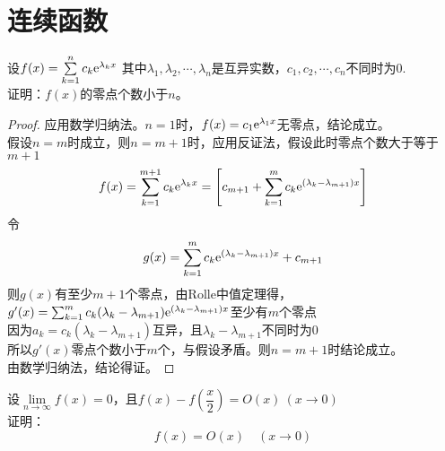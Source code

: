 \section{连续函数}

\begin{proposition}

    设$f(x) = \sum\limits_{k=1}^{n}{c_k\mathrm{e}^{\lambda_k x}}$
    其中$\lambda_1,\lambda_2,\cdots,\lambda_n$是互异实数，$c_1, c_2, \cdots , c_n$不同时为$0$.\\
    证明：$f(x)$的零点个数小于$n$。

\end{proposition}

\begin{proof}

    应用数学归纳法。$n=1$时，$f(x) = c_1 \mathrm{e}^{\lambda_1 x}$无零点，结论成立。\\
    假设$n = m$时成立，则$n = m + 1$时，应用反证法，假设此时零点个数大于等于$m+1$
    $$f(x) = \sum_{k=1}^{m+1}{c_k\mathrm{e}^{\lambda_k x}} = \left[c_{m+1} + \sum_{k=1}^{m}{c_k\mathrm{e}^{(\lambda_k - \lambda_{m+1}) x}}\right]$$
    令
    $$g(x) = \sum_{k=1}^{m}{c_k\mathrm{e}^{(\lambda_k - \lambda_{m+1}) x}} + c_{m+1}$$
    则$g(x)$有至少$m+1$个零点，由\textup{Rolle}中值定理得，$g'(x) = \sum_{k=1}^{m}{c_k (\lambda_k - \lambda_{m+1}) \mathrm{e}^{(\lambda_k - \lambda_{m+1}) x}}$至少有$m$个零点\\
    因为$a_k = c_k(\lambda_k - \lambda_{m+1})$互异，且$\lambda_k - \lambda_{m+1}$不同时为$0$\\
    所以$g'(x)$零点个数小于$m$个，与假设矛盾。则$n = m+1$时结论成立。\\
    由数学归纳法，结论得证。

\end{proof}

\begin{proposition}

    设$\lim\limits_{n\to\infty}{f(x)} = 0$，且$f(x) - f\left(\dfrac{x}{2}\right) = O(x) \ (x\to 0)$\\
    证明：
    $$f(x) = O(x) \quad (x \to 0)$$

\end{proposition}


